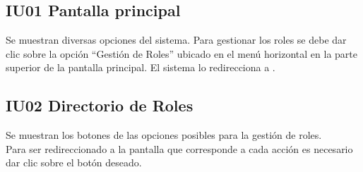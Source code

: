 \newpage
\subsection{IU01 Pantalla principal}
	Se muestran diversas opciones del sistema. Para gestionar los roles se debe dar clic sobre la opción ``Gestión de Roles'' ubicado en el menú horizontal en la parte superior de la pantalla principal.
	El sistema lo redirecciona a .

\subsection{IU02 Directorio de Roles}
	Se muestran los botones de las opciones posibles para la gestión de roles. \\
	Para ser redireccionado a la pantalla que corresponde a cada acción es necesario dar clic sobre el botón deseado.


%
%
%
%
%
%

